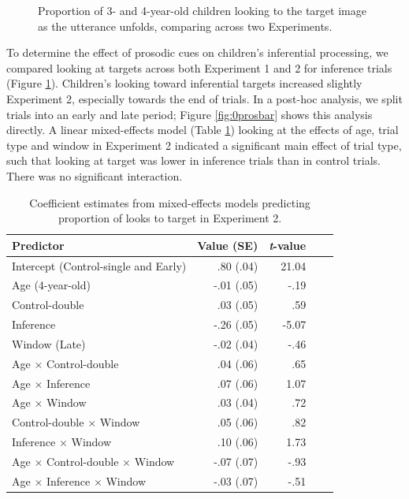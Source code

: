 \documentclass[10pt,letterpaper]{article}
\begin{document}
\begin{figure}[t]
	\caption{\label{fig:pros0} Proportion of 3- and 4-year-old children looking to the target image as the utterance unfolds, comparing across two Experiments.}
\end{figure}

To determine the effect of prosodic cues on children's inferential processing, we compared looking at targets across both Experiment 1 and 2 for inference trials (Figure \ref{fig:pros0}). Children's looking toward inferential targets increased slightly Experiment 2, especially towards the end of trials. In a post-hoc analysis, we split trials into an early and late period; Figure \ref{fig:0prosbar} shows this analysis directly. A linear mixed-effects model (Table \ref{tab:lmer3}) looking at the effects of age, trial type and window in Experiment 2 indicated a significant main effect of trial type, such that looking at target was lower in inference trials than in control trials. There was no significant interaction.

\begin{table}[b!]
\caption{\label{tab:lmer3}  Coefficient estimates from mixed-effects models predicting proportion of looks to target in Experiment 2.} 
\begin{center} 
\begin{tabular}{l r r r l} 
\hline
Predictor  &  Value (SE) & \emph{t}-value\\
\hline
Intercept (Control-single and Early)  & .80 (.04) & 21.04 \\
Age (4-year-old) & -.01 (.05) &  -.19 \\
Control-double & .03 (.05) & .59 \\
Inference & -.26 (.05) & -5.07 \\
Window (Late) & -.02 (.04) & -.46 \\
Age $\times$  Control-double & .04 (.06) & .65 \\
Age $\times$  Inference & .07 (.06) & 1.07 \\
Age $\times$  Window & .03 (.04) & .72 \\
Control-double $\times$  Window & .05 (.06) & .82 \\
Inference $\times$ Window & .10 (.06) & 1.73 \\
Age $\times$ Control-double $\times$ Window & -.07 (.07) & -.93 \\
Age $\times$ Inference $\times$ Window & -.03 (.07) & -.51 \\
\hline
\end{tabular} 
\end{center} 
\end{table}
\end{document}
